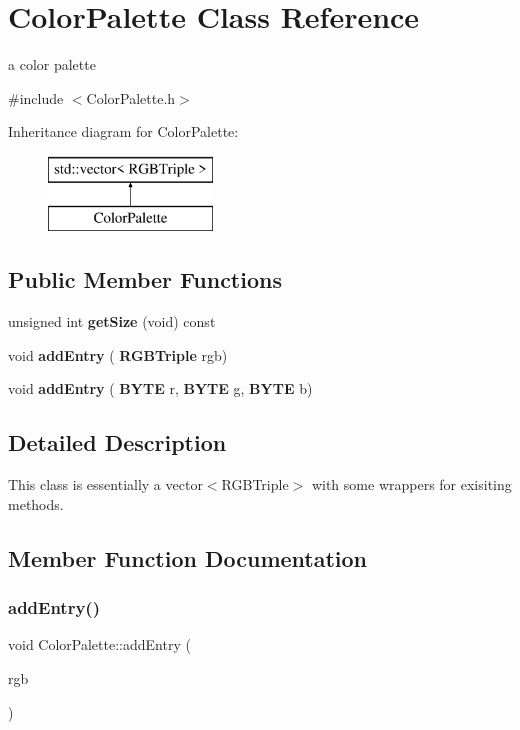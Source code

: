 \section{Color\+Palette Class Reference}
\label{classColorPalette}


a color palette  




{\ttfamily \#include $<$Color\+Palette.\+h$>$}

Inheritance diagram for Color\+Palette\+:\begin{figure}[H]
\begin{center}
\leavevmode
\includegraphics[height=2.000000cm]{classColorPalette}
\end{center}
\end{figure}
\subsection*{Public Member Functions}
\begin{DoxyCompactItemize}
\item 
unsigned int \textbf{ get\+Size} (void) const
\item 
void \textbf{ add\+Entry} (\textbf{ R\+G\+B\+Triple} rgb)
\item 
void \textbf{ add\+Entry} (\textbf{ B\+Y\+TE} r, \textbf{ B\+Y\+TE} g, \textbf{ B\+Y\+TE} b)
\end{DoxyCompactItemize}


\subsection{Detailed Description}
This class is essentially a vector$<$\+R\+G\+B\+Triple$>$ with some wrappers for exisiting methods. 

\subsection{Member Function Documentation}
\mbox{\label{classColorPalette_a1aee942b853cb4dedc2f2b57bb82542b}} 
\subsubsection{add\+Entry()\hspace{0.1cm}{\footnotesize\ttfamily [1/2]}}
{\footnotesize\ttfamily void Color\+Palette\+::add\+Entry (\begin{DoxyParamCaption}\item[{\textbf{ R\+G\+B\+Triple}}]{rgb }\end{DoxyParamCaption})\hspace{0.3cm}{\ttfamily [inline]}}

